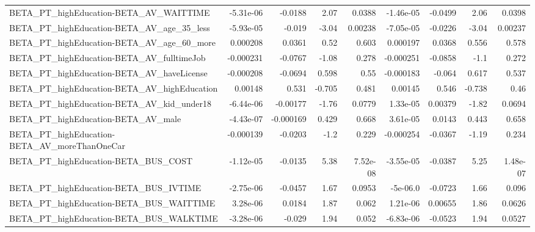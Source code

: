\begin{tabular}{lrrrrrrrr}
BETA\_PT\_highEducation-BETA\_AV\_WAITTIME             &   -5.31e-06 &      -0.0188 &     2.07 &   0.0388 &  -1.46e-05 &     -0.0499 &         2.06 &        0.0398 \\
BETA\_PT\_highEducation-BETA\_AV\_age\_35\_less          &   -5.93e-05 &       -0.019 &    -3.04 &  0.00238 &  -7.05e-05 &     -0.0226 &        -3.04 &       0.00237 \\
BETA\_PT\_highEducation-BETA\_AV\_age\_60\_more          &    0.000208 &       0.0361 &     0.52 &    0.603 &   0.000197 &      0.0368 &        0.556 &         0.578 \\
BETA\_PT\_highEducation-BETA\_AV\_fulltimeJob          &   -0.000231 &      -0.0767 &    -1.08 &    0.278 &  -0.000251 &     -0.0858 &         -1.1 &         0.272 \\
BETA\_PT\_highEducation-BETA\_AV\_haveLicense          &   -0.000208 &      -0.0694 &    0.598 &     0.55 &  -0.000183 &      -0.064 &        0.617 &         0.537 \\
BETA\_PT\_highEducation-BETA\_AV\_highEducation        &     0.00148 &        0.531 &   -0.705 &    0.481 &    0.00145 &       0.546 &       -0.738 &          0.46 \\
BETA\_PT\_highEducation-BETA\_AV\_kid\_under18          &   -6.44e-06 &     -0.00177 &    -1.76 &   0.0779 &   1.33e-05 &     0.00379 &        -1.82 &        0.0694 \\
BETA\_PT\_highEducation-BETA\_AV\_male                 &   -4.43e-07 &    -0.000169 &    0.429 &    0.668 &   3.61e-05 &      0.0143 &        0.443 &         0.658 \\
BETA\_PT\_highEducation-BETA\_AV\_moreThanOneCar       &   -0.000139 &      -0.0203 &     -1.2 &    0.229 &  -0.000254 &     -0.0367 &        -1.19 &         0.234 \\
BETA\_PT\_highEducation-BETA\_BUS\_COST                &   -1.12e-05 &      -0.0135 &     5.38 & 7.52e-08 &  -3.55e-05 &     -0.0387 &         5.25 &      1.48e-07 \\
BETA\_PT\_highEducation-BETA\_BUS\_IVTIME              &   -2.75e-06 &      -0.0457 &     1.67 &   0.0953 &   -5e-06.0 &     -0.0723 &         1.66 &         0.096 \\
BETA\_PT\_highEducation-BETA\_BUS\_WAITTIME            &    3.28e-06 &       0.0184 &     1.87 &    0.062 &   1.21e-06 &     0.00655 &         1.86 &        0.0626 \\
BETA\_PT\_highEducation-BETA\_BUS\_WALKTIME            &   -3.28e-06 &       -0.029 &     1.94 &    0.052 &  -6.83e-06 &     -0.0523 &         1.94 &        0.0527 \\

\end{tabular}
